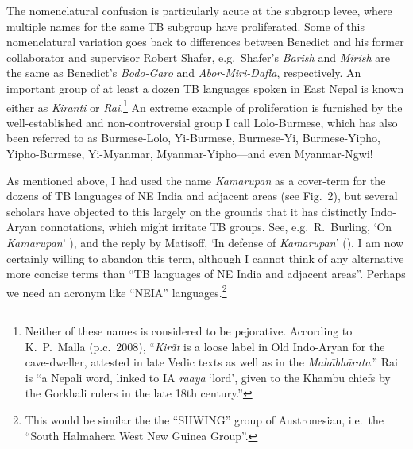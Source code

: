 The nomenclatural confusion is particularly acute at the subgroup levee, where multiple names for the same TB subgroup have proliferated.
Some of this nomenclatural variation goes back
to differences between Benedict and his former collaborator and supervisor
Robert Shafer, %
 e.g.\ Shafer’s \textit{Barish} and \textit{Mirish} are the same as Benedict’s
\textit{Bodo-Garo} and \textit{Abor-Miri-Dafla}, respectively. An important group of at least a
dozen TB languages spoken in East Nepal is known either as \textit{Kiranti} or
\textit{Rai}.\footnote{Neither of these names is considered to be pejorative. According to K.~P.~Malla (p.c.~2008), “\textit{Kirãt} is a loose label in Old Indo-Aryan for the cave-dweller, attested in late Vedic texts as well as in the \textit{Mahābhārata}.” Rai is “a Nepali word, linked to IA \textit{raaya} ‘lord’, given to the Khambu chiefs by the Gorkhali rulers in the late 18th century.”}
  An extreme example of proliferation is furnished by the well-established and
non-controversial group I call Lolo-Burmese, which has also been referred to as
Burmese-Lolo, Yi-Burmese, Burmese-Yi, Burmese-Yipho, Yipho-Burmese, Yi-Myanmar,
Myanmar-Yipho—and even Myanmar-Ngwi!

As mentioned above, I had used the name \textit{Kamarupan} as a cover-term for the dozens of TB languages of NE India and adjacent areas (see Fig.~2), but several scholars have objected to this
largely on the grounds that it has distinctly Indo-Aryan connotations, which
might irritate TB groups. See, e.g.\ R.~Burling, ‘On \textit{Kamarupan}’ \citeyear{RB-OK}), and the reply by Matisoff, ‘In defense of \textit{Kamarupan}’ (\citeyear{JAM-IDK}). 
I am now certainly willing to abandon this term, although I cannot think of any alternative more concise terms than “TB languages of NE India and adjacent areas”. Perhaps we need an acronym like “NEIA” languages.\footnote{This would be similar the the “SHWING” group of Austronesian, i.e.\ the “South Halmahera West New Guinea Group”.}

